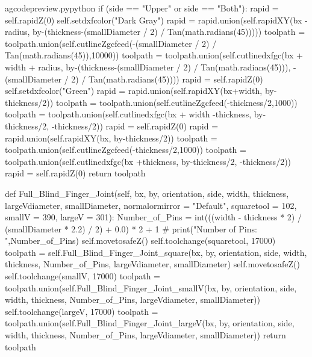 \documentclass{ltxdoc}
\begin{document}
\begin{writecode}{a}{gcodepreview.py}{python}
            if (side == "Upper" or side == "Both"):
                rapid = self.rapidZ(0)
                self.setdxfcolor("Dark Gray")
                rapid = rapid.union(self.rapidXY(bx - radius, by-(thickness-(smallDiameter / 2) / Tan(math.radians(45)))))
                toolpath = toolpath.union(self.cutlineZgcfeed(-(smallDiameter / 2) / Tan(math.radians(45)),10000))
                toolpath = toolpath.union(self.cutlinedxfgc(bx + width + radius, by-(thickness-(smallDiameter / 2) / Tan(math.radians(45))), -(smallDiameter / 2) / Tan(math.radians(45))))
                rapid = self.rapidZ(0)
                self.setdxfcolor("Green")
                rapid = rapid.union(self.rapidXY(bx+width, by-thickness/2))
                toolpath = toolpath.union(self.cutlineZgcfeed(-thickness/2,1000))
                toolpath = toolpath.union(self.cutlinedxfgc(bx + width -thickness, by-thickness/2, -thickness/2))
                rapid = self.rapidZ(0)
                rapid = rapid.union(self.rapidXY(bx, by-thickness/2))
                toolpath = toolpath.union(self.cutlineZgcfeed(-thickness/2,1000))
                toolpath = toolpath.union(self.cutlinedxfgc(bx +thickness, by-thickness/2, -thickness/2))
        rapid = self.rapidZ(0)
        return toolpath

    def Full_Blind_Finger_Joint(self, bx, by, orientation, side, width, thickness, largeVdiameter, smallDiameter, normalormirror = "Default", squaretool = 102, smallV = 390, largeV = 301):
        Number_of_Pins = int(((width - thickness * 2) / (smallDiameter * 2.2) / 2) + 0.0) * 2 + 1
#        print("Number of Pins: ",Number_of_Pins)
        self.movetosafeZ()
        self.toolchange(squaretool, 17000)
        toolpath = self.Full_Blind_Finger_Joint_square(bx, by, orientation, side, width, thickness, Number_of_Pins, largeVdiameter, smallDiameter)
        self.movetosafeZ()
        self.toolchange(smallV, 17000)
        toolpath = toolpath.union(self.Full_Blind_Finger_Joint_smallV(bx, by, orientation, side, width, thickness, Number_of_Pins, largeVdiameter, smallDiameter))
        self.toolchange(largeV, 17000)
        toolpath = toolpath.union(self.Full_Blind_Finger_Joint_largeV(bx, by, orientation, side, width, thickness, Number_of_Pins, largeVdiameter, smallDiameter))
        return toolpath

\end{writecode}
\addtocounter{gcpy}{259}
\end{document}

